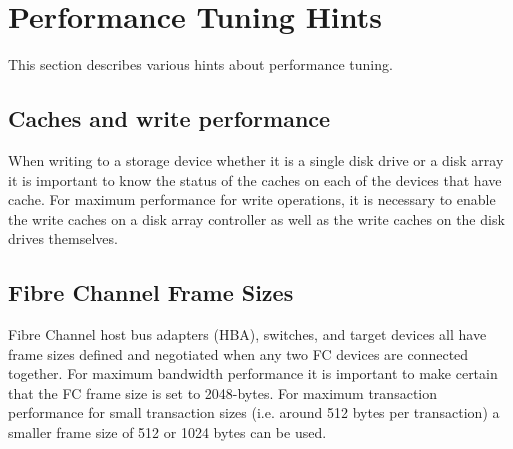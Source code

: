 \newpage
\section{Performance Tuning Hints}\label{performance-tuning-hints}

This section describes various hints about performance tuning.

\subsection{\texorpdfstring{Caches and write performance }{Caches and write performance }}\label{caches-and-write-performance}

When writing to a storage device whether it is a single disk drive or a disk array it is important to know the status of the caches on each of the devices that have cache. For maximum performance for write operations, it is necessary to enable the write caches on a disk array controller as well as the write caches on the disk drives themselves.

\subsection{Fibre Channel Frame Sizes}\label{fibre-channel-frame-sizes}

Fibre Channel host bus adapters (HBA), switches, and target devices all have frame sizes defined and negotiated when any two FC devices are connected together. For maximum bandwidth performance it is important to make certain that the FC frame size is set to 2048-bytes. For maximum transaction performance for small transaction sizes (i.e. around 512 bytes per transaction) a smaller frame size of 512 or 1024 bytes can be used.

